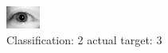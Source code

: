 \begin{figure}[h!]
\begin{center}
\includegraphics[width=0.60\columnwidth]{figures/ID3100_class_2_target_3.png}
\end{center}
\caption{ Classification: 2 actual target: 3}
\label{fig:ID3100_class_2_target_3}
\end{figure}
